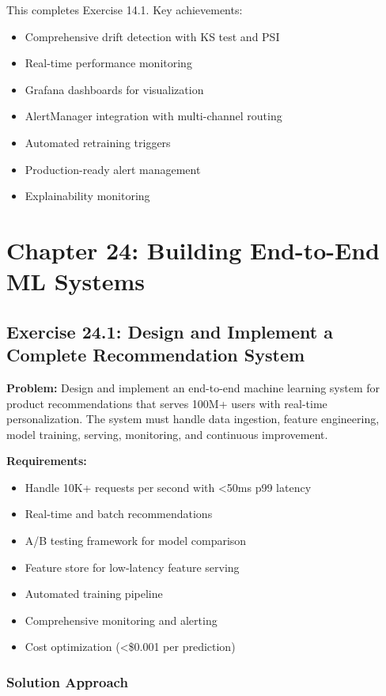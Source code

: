 This completes Exercise 14.1. Key achievements:
\begin{itemize}
    \item Comprehensive drift detection with KS test and PSI
    \item Real-time performance monitoring
    \item Grafana dashboards for visualization
    \item AlertManager integration with multi-channel routing
    \item Automated retraining triggers
    \item Production-ready alert management
    \item Explainability monitoring
\end{itemize}

\section{Chapter 24: Building End-to-End ML Systems}

\subsection{Exercise 24.1: Design and Implement a Complete Recommendation System}

\textbf{Problem:} Design and implement an end-to-end machine learning system for product recommendations that serves 100M+ users with real-time personalization. The system must handle data ingestion, feature engineering, model training, serving, monitoring, and continuous improvement.

\textbf{Requirements:}
\begin{itemize}
    \item Handle 10K+ requests per second with <50ms p99 latency
    \item Real-time and batch recommendations
    \item A/B testing framework for model comparison
    \item Feature store for low-latency feature serving
    \item Automated training pipeline
    \item Comprehensive monitoring and alerting
    \item Cost optimization (<\$0.001 per prediction)
\end{itemize}

\subsubsection{Solution Approach}

